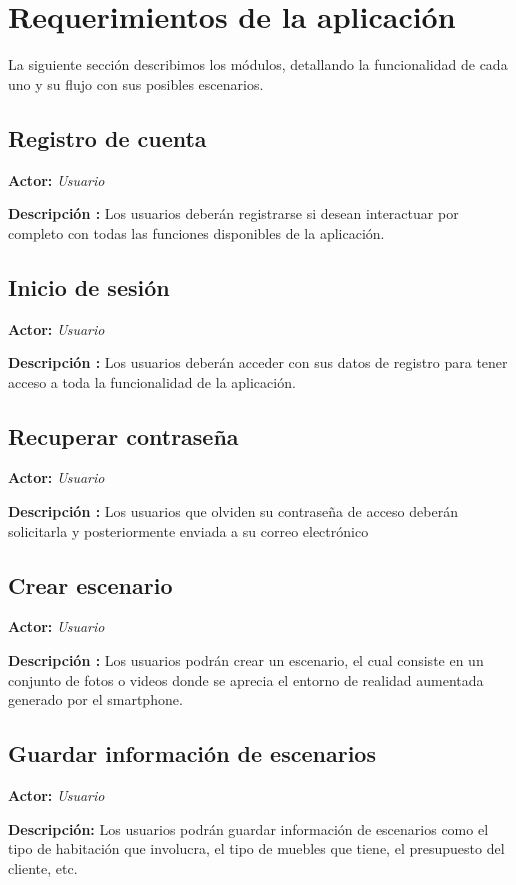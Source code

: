 \section{Requerimientos de la aplicación}
La siguiente sección describimos los módulos, detallando la funcionalidad de cada uno y su flujo con sus posibles escenarios.\par

\subsection{Registro de cuenta}
\textbf{Actor:} \textit{Usuario} \par
\textbf{Descripción :} Los usuarios deberán registrarse si desean interactuar por completo con todas las funciones disponibles de la aplicación.

\subsection{Inicio de sesión}
\textbf{Actor:} \textit{Usuario} \par
\textbf{Descripción :} Los usuarios deberán acceder con sus datos de registro para tener acceso a toda la funcionalidad de la aplicación.

\subsection{Recuperar contraseña}
\textbf{Actor:} \textit{Usuario} \par
\textbf{Descripción :} Los usuarios que olviden su contraseña de acceso deberán solicitarla y posteriormente enviada a su correo electrónico

\subsection{Crear escenario}
\textbf{Actor:} \textit{Usuario} \par
\textbf{Descripción :} Los usuarios podrán crear un escenario, el cual consiste en un conjunto de fotos o videos donde se aprecia el entorno de realidad aumentada generado por el smartphone.

\subsection{Guardar información de escenarios}
\textbf{Actor:} \textit{Usuario} \par
\textbf{Descripción:} Los usuarios podrán guardar información de escenarios como el tipo de habitación que involucra, el tipo de muebles que tiene, el presupuesto del cliente, etc.

